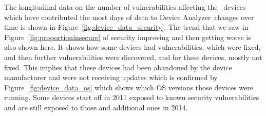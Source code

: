 \documentclass[conference,a4paper,twoside]{IEEEtran}
\newcommand{\da}{Device Analyzer}
\begin{document}
The longitudinal data on the number of vulnerabilities affecting the \daNumDeviceDataDevices\ devices which have contributed the most days of data to \da\ changes over time is shown in Figure~\ref{fig:device_data_security}.
The trend that we saw in Figure~\ref{fig:proportioninsecure} of security improving and then getting worse is also shown here.
It shows how some devices had vulnerabilities, which were fixed, and then further vulnerabilities were discovered, and for these devices, mostly not fixed.
This implies that these devices had been abandoned by the device manufacturer and were not receiving updates which is confirmed by Figure~\ref{fig:device_data_os} which shows which OS versions those devices were running.
Some devices start off in 2011 exposed to known security vulnerabilities and are still exposed to those and additional ones in 2014.
\end{document}
